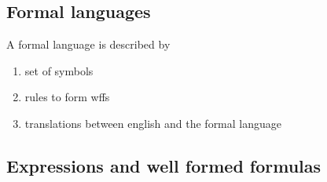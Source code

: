 \documentclass[../main.tex]{subfiles}
\begin{document}
\subsection{Formal languages}

\begin{definition}
    A formal language is described by
    \begin{enumerate}
        \item set of symbols
        \item rules to form wffs
        \item translations between english and the formal language
    \end{enumerate}
\end{definition}


\subsection{Expressions and well formed formulas}
\end{document}

